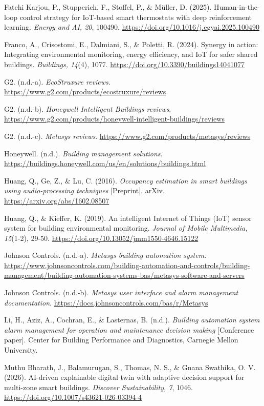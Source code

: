 \documentclass[11pt,a4paper]{article}
\begin{document}
Fatehi Karjou, P., Stupperich, F., Stoffel, P., \& M\"uller, D. (2025). Human-in-the-loop control strategy for IoT-based smart thermostats with deep reinforcement learning. \textit{Energy and AI, 20}, 100490. \url{https://doi.org/10.1016/j.egyai.2025.100490}

Franco, A., Crisostomi, E., Dalmiani, S., \& Poletti, R. (2024). Synergy in action: Integrating environmental monitoring, energy efficiency, and IoT for safer shared buildings. \textit{Buildings, 14}(4), 1077. \url{https://doi.org/10.3390/buildings14041077}

G2. (n.d.-a). \textit{EcoStruxure reviews}. \url{https://www.g2.com/products/ecostruxure/reviews}

G2. (n.d.-b). \textit{Honeywell Intelligent Buildings reviews}. \url{https://www.g2.com/products/honeywell-intelligent-buildings/reviews}

G2. (n.d.-c). \textit{Metasys reviews}. \url{https://www.g2.com/products/metasys/reviews}

Honeywell. (n.d.). \textit{Building management solutions}. \url{https://buildings.honeywell.com/us/en/solutions/buildings.html}

Huang, Q., Ge, Z., \& Lu, C. (2016). \textit{Occupancy estimation in smart buildings using audio-processing techniques} [Preprint]. arXiv. \url{https://arxiv.org/abs/1602.08507}

Huang, Q., \& Kieffer, K. (2019). An intelligent Internet of Things (IoT) sensor system for building environmental monitoring. \textit{Journal of Mobile Multimedia, 15}(1-2), 29-50. \url{https://doi.org/10.13052/jmm1550-4646.15122}

Johnson Controls. (n.d.-a). \textit{Metasys building automation system}. \url{https://www.johnsoncontrols.com/building-automation-and-controls/building-management/building-automation-systems-bas/metasys-software-and-servers}

Johnson Controls. (n.d.-b). \textit{Metasys user interface and alarm management documentation}. \url{https://docs.johnsoncontrols.com/bas/r/Metasys}

Li, H., Aziz, A., Cochran, E., \& Lasternas, B. (n.d.). \textit{Building automation system alarm management for operation and maintenance decision making} [Conference paper]. Center for Building Performance and Diagnostics, Carnegie Mellon University.

Muthu Bharath, J., Balamurugan, S., Thomas, N. S., \& Gnana Swathika, O. V. (2026). AI-driven explainable digital twin with adaptive decision support for multi-zone smart buildings. \textit{Discover Sustainability, 7}, 1046. \url{https://doi.org/10.1007/s43621-026-03394-4}
\end{document}
